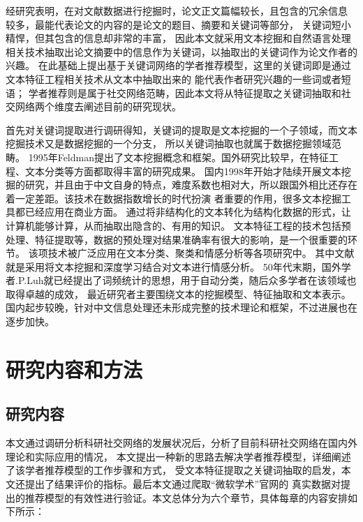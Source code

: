 经研究表明，在对文献数据进行挖掘时，论文正文篇幅较长，且包含的冗余信息%
较多，最能代表论文的内容的是论文的题目、摘要和关键词等部分，%
关键词短小精悍，但其包含的信息却非常的丰富，
因此本文就采用文本挖掘和自然语言处理相关技术抽取出论文摘要中的信息作为关键词，以抽取出的关键词作为论文作者的兴趣。
在此基础上提出基于关键词网络的学者推荐模型，这里的关键词即是通过文本特征工程相关技术从文本中抽取出来的%
能代表作者研究兴趣的一些词或者短语；
学者推荐则是属于社交网络范畴，因此本文将从特征提取之关键词抽取和社交网络两个维度去阐述目前的研究现状。%

首先对关键词提取进行调研得知，关键词的提取是文本挖掘的一个子领域，而文本挖掘技术又是数据挖掘的一个分支，%
所以关键词抽取也就属于数据挖掘领域范畴。
1995年Feldman提出了文本挖掘概念和框架。国外研究比较早，在特征工程、文本分类等方面都取得丰富的研究成果。%
国内1998年开始才陆续开展文本挖掘的研究，并且由于中文自身的特点，难度系数也相对大，所以跟国外相比还存在%
着一定差距。该技术在数据指数增长的时代扮演%
者重要的作用，很多文本挖掘工具都已经应用在商业方面。%
通过将非结构化的文本转化为结构化数据的形式，让计算机能够计算，从而抽取出隐含的、有用的知识。%
文本特征工程的技术包括预处理、特征提取等，数据的预处理对结果准确率有很大的影响，是一个很重要的环节。%
该项技术被广泛应用在文本分类、聚类和情感分析等各项研究中。%
其中文献就是采用将文本挖掘和深度学习结合对文本进行情感分析。%
50年代末期，国外学者.P.Luh就已经提出了词频统计的思想，用于自动分类，随后众多学者在该领域也取得卓越的成效，%
最近研究者主要围绕文本的挖掘模型、特征抽取和文本表示。%
国内起步较晚，针对中文信息处理还未形成完整的技术理论和框架，不过进展也在逐步加快。



\section{研究内容和方法}
\subsection{研究内容}
本文通过调研分析科研社交网络的发展状况后，分析了目前科研社交网络在国内外理论和实际应用的情况，%
本文提出一种新的思路去解决学者推荐模型，详细阐述了该学者推荐模型的工作步骤和方式，%
受文本特征提取之关键词抽取的启发，本文还提出了结果评价的指标。最后本文通过爬取“微软学术”官网的%
真实数据对提出的推荐模型的有效性进行验证。本文总体分为六个章节，具体每章的内容安排如下所示：


